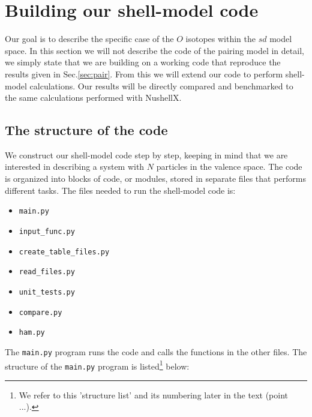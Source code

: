 \documentclass[twoside]{article}
\begin{document}
\section{Building our shell-model code}
\label{sec:ourcode}

Our goal is to describe the specific case of the $O$ isotopes within the $sd$ model space. In this section we will not describe the code of the pairing model in detail, we simply state that we are building on a working code that reproduce the results given in Sec.\ref{sec:pair}. From this we will extend our code to perform shell-model calculations. Our results will be directly compared and benchmarked to the same calculations performed with NushellX.

\subsection{The structure of the code}

We construct our shell-model code step by step, keeping in mind that we are interested in describing a system with $N$ particles in the valence space. The code is organized into blocks of code, or modules, stored in separate files that performs different tasks. The files needed to run the shell-model code is:
\begin{itemize}
\item \texttt{main.py}
\item \texttt{input\_func.py}
\item \texttt{create\_table\_files.py}
\item \texttt{read\_files.py}
\item \texttt{unit\_tests.py} 
\item \texttt{compare.py}
\item \texttt{ham.py} 
\end{itemize}
\smallskip

The \texttt{main.py} program runs the code and calls the functions in the other files. The structure of the \texttt{main.py} program is listed\footnote{We refer to this 'structure list' and its numbering later in the text (point ...).} below:
\end{document}
